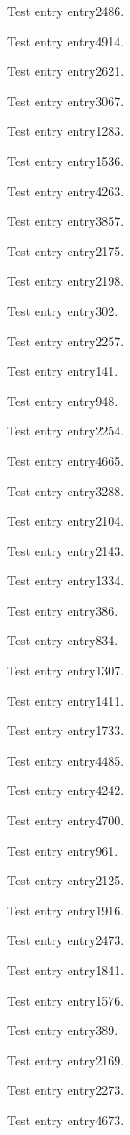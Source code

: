 Test entry \gls{entry2486}.

Test entry \gls{entry4914}.

Test entry \gls{entry2621}.

Test entry \gls{entry3067}.

Test entry \gls{entry1283}.

Test entry \gls{entry1536}.

Test entry \gls{entry4263}.

Test entry \gls{entry3857}.

Test entry \gls{entry2175}.

Test entry \gls{entry2198}.

Test entry \gls{entry302}.

Test entry \gls{entry2257}.

Test entry \gls{entry141}.

Test entry \gls{entry948}.

Test entry \gls{entry2254}.

Test entry \gls{entry4665}.

Test entry \gls{entry3288}.

Test entry \gls{entry2104}.

Test entry \gls{entry2143}.

Test entry \gls{entry1334}.

Test entry \gls{entry386}.

Test entry \gls{entry834}.

Test entry \gls{entry1307}.

Test entry \gls{entry1411}.

Test entry \gls{entry1733}.

Test entry \gls{entry4485}.

Test entry \gls{entry4242}.

Test entry \gls{entry4700}.

Test entry \gls{entry961}.

Test entry \gls{entry2125}.

Test entry \gls{entry1916}.

Test entry \gls{entry2473}.

Test entry \gls{entry1841}.

Test entry \gls{entry1576}.

Test entry \gls{entry389}.

Test entry \gls{entry2169}.

Test entry \gls{entry2273}.

Test entry \gls{entry4673}.

